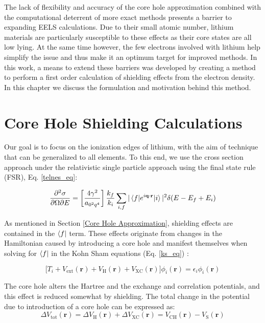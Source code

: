 




The lack of flexibility and accuracy of the core hole approximation combined with the computational deterrent of more exact methods presents a barrier to expanding EELS calculations.  Due to their small atomic number, lithium materials are particularly susceptible to these effects as their core states are all low lying.  At the same time however, the few electrons involved with lithium help simplify the issue and thus make it an optimum target for improved methods.  In this work, a means to extend these barriers was developed by creating a method to perform a first order calculation of shielding effects from the electron density.   In this chapter we discuss the formulation and motivation behind this method. 

\section{Core Hole Shielding Calculations}
Our goal is to focus on the ionization edges of lithium, with the aim of technique that can be generalized to all elements.  To this end, we use the cross section approach under the relativistic single particle approach using the final state rule (FSR), Eq. \ref{telnes_eq}\cite{jorissen2007ab}:

\begin{equation}
	\frac{\partial^2 \sigma}{\partial \Omega \partial E} = \left[\frac{4\gamma^2}{a_{\mathrm{0}^2q^4}}\right] \frac{k_f}{k_i} \sum_{i,f}|\mel{f}{e^{i\textbf{q}\cdot\textbf{r}}}{i}|^2\delta(E-E_f+E_i)
\end{equation}

As mentioned in Section \ref{Core Hole Approximation}, shielding effects are contained in the $\bra{f}$ term. These effects originate from changes in the Hamiltonian caused by introducing a core hole and manifest themselves when solving for $\bra{f}$ in the Kohn Sham equations (Eq. \ref{ks_eq}) \cite{kohn_self-consistent_1965}:  

\begin{equation}
    \bigg[T_i + V_{\mathrm{ext}}(\textbf{r}) + V_{\mathrm{H}}(\textbf{r}) + V_{\mathrm{XC}}(\textbf{r})\bigg] \phi_i(\textbf{r}) = \epsilon_i \phi_i(\textbf{r})
\end{equation}

The core hole alters the Hartree and the exchange and correlation potentials, and this effect is reduced somewhat by shielding.  The total change in the potential due to introduction of a core hole can be expressed as: 
\begin{equation}
\Delta V_{\mathrm{tot}}(\textbf{r})=\Delta V_{\mathrm{H}}(\textbf{r}) +\Delta V_{\mathrm{XC}}(\textbf{r})=V_{\mathrm{CH}}(\textbf{r}) - V_{\mathrm{S}}(\textbf{r})
\label{delta_potentials}
\end{equation}

